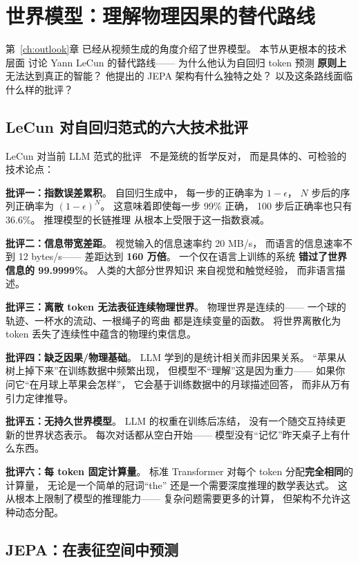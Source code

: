 \section{世界模型：理解物理因果的替代路线}
\label{sec:world-models}

第~\ref{ch:outlook}章
已经从视频生成的角度介绍了世界模型。
本节从更根本的技术层面
讨论 Yann LeCun 的替代路线——
为什么他认为自回归 token 预测
\textbf{原则上}无法达到真正的智能？
他提出的 JEPA 架构有什么独特之处？
以及这条路线面临什么样的批评？

\subsection{LeCun 对自回归范式的六大技术批评}

LeCun 对当前 LLM 范式的批评~\cite{lecun2022path}
不是笼统的哲学反对，
而是具体的、可检验的技术论点：

\textbf{批评一：指数误差累积}。
自回归生成中，
每一步的正确率为 $1-\epsilon$，
$N$ 步后的序列正确率为 $(1-\epsilon)^N$。
这意味着即使每一步 99\% 正确，
100 步后正确率也只有 36.6\%。
推理模型的长链推理
从根本上受限于这一指数衰减。

\textbf{批评二：信息带宽差距}。
视觉输入的信息速率约 20 MB/s，
而语言的信息速率不到 12 bytes/s——
差距达到 \textbf{160 万倍}。
一个仅在语言上训练的系统
\textbf{错过了世界信息的 99.9999\%}。
人类的大部分世界知识
来自视觉和触觉经验，
而非语言描述。

\textbf{批评三：离散 token 无法表征连续物理世界}。
物理世界是连续的——
一个球的轨迹、一杯水的流动、一根绳子的弯曲
都是连续变量的函数。
将世界离散化为 token
丢失了连续性中蕴含的物理约束信息。

\textbf{批评四：缺乏因果/物理基础}。
LLM 学到的是统计相关而非因果关系。
``苹果从树上掉下来''在训练数据中频繁出现，
但模型不``理解''这是因为重力——
如果你问它``在月球上苹果会怎样''，
它会基于训练数据中的月球描述回答，
而非从万有引力定律推导。

\textbf{批评五：无持久世界模型}。
LLM 的权重在训练后冻结，
没有一个随交互持续更新的世界状态表示。
每次对话都从空白开始——
模型没有``记忆''昨天桌子上有什么东西。

\textbf{批评六：每 token 固定计算量}。
标准 Transformer 对每个 token
分配\textbf{完全相同}的计算量，
无论是一个简单的冠词``the''
还是一个需要深度推理的数学表达式。
这从根本上限制了模型的推理能力——
复杂问题需要更多的计算，
但架构不允许这种动态分配。

\subsection{JEPA：在表征空间中预测}

